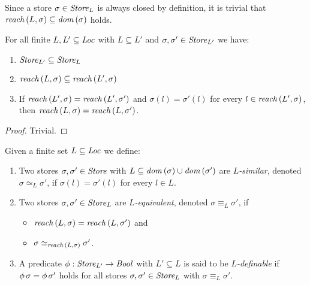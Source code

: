 \documentclass[12pt,a4paper]{report}
\begin{document}
Since a store $\sigma\in\mathit{Store}_L$ is always closed by definition, it is trivial that
$\mathit{reach}\,(L,\sigma) \subseteq \mathit{dom}\,(\sigma)$ holds.

\begin{lemma}
  For all finite $L,L'\subseteq\mathit{Loc}$ with $L \subseteq L'$ and $\sigma,\sigma'\in\mathit{Store}_{L'}$ we have:
  \begin{enumerate}
    \item $\mathit{Store}_{L'} \subseteq \mathit{Store}_L$
    \item $\mathit{reach}\,(L,\sigma) \subseteq \mathit{reach}\,(L',\sigma)$
    \item If $\mathit{reach}\,(L',\sigma) = \mathit{reach}\,(L',\sigma')$ and $\sigma(l) = \sigma'(l)$ for every $l\in\mathit{reach}\,(L',\sigma)$,
          then $\mathit{reach}\,(L,\sigma) = \mathit{reach}\,(L,\sigma')$.
  \end{enumerate}
\end{lemma}

\begin{proof}
  Trivial.
\end{proof}

\begin{definition}
  Given a finite set $L \subseteq \mathit{Loc}$ we define:
  \begin{enumerate}
    \item Two stores $\sigma,\sigma'\in\mathit{Store}$ with $L \subseteq \mathit{dom}\,(\sigma) \cup \mathit{dom}\,(\sigma')$ are
          {\em $L$-similar}, denoted $\sigma \simeq_L \sigma'$, if $\sigma(l)=\sigma'(l)$ for every
          $l \in L$.

    \item Two stores $\sigma,\sigma'\in\mathit{Store}_L$ are {\em $L$-equivalent}, denoted $\sigma \equiv_L \sigma'$,
          if
          \begin{itemize}
            \item $\mathit{reach}\,(L,\sigma) = \mathit{reach}\,(L,\sigma')$ and
            \item $\sigma \simeq_{\mathit{reach}\,(L,\sigma)} \sigma'$.
          \end{itemize}

    \item A predicate $\phi:\mathit{Store}_{L'} \to \mathit{Bool}$ with $L' \subseteq L$ is said to be {\em $L$-definable} if
          $\phi\,\sigma = \phi\,\sigma'$ holds for all
          stores $\sigma,\sigma'\in\mathit{Store}_L$ with $\sigma \equiv_L \sigma'$.
  \end{enumerate}
\end{definition}
\end{document}

